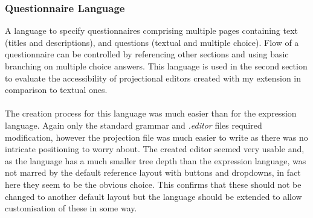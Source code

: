 \documentclass{article}
\begin{document}
{%

\subsubsection{Questionnaire Language}\label{questionnaireLang}
A language to specify questionnaires comprising multiple pages containing text (titles and descriptions), and questions (textual and multiple choice). Flow of a questionnaire can be controlled by referencing other sections and using basic branching on multiple choice answers. This language is used in the second section to evaluate the accessibility of projectional editors created with my extension in comparison to textual ones.
\\
\\
The creation process for this language was much easier than for the expression language. Again only the standard grammar and \emph{.editor} files required modification, however the projection file was much easier to write as there was no intricate positioning to worry about. The created editor seemed very usable and, as the language has a much smaller tree depth than the expression language, was not marred by the default reference layout with buttons and dropdowns, in fact here they seem to be the obvious choice. This confirms that these should not be changed to another default layout but the language should be extended to allow customisation of these in some way.




}
\end{document}
